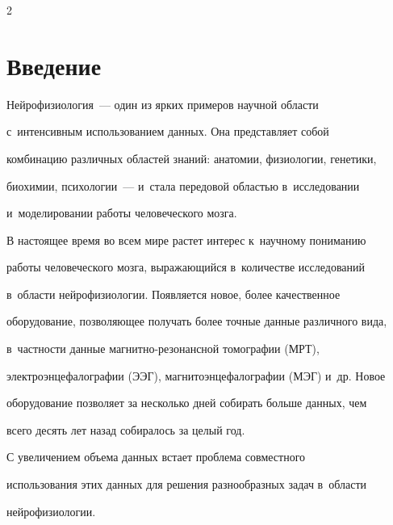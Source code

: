 \begin{multicols}{2}





\label{st\stat}





\section{Введение}










    Нейрофизиология~--- один из ярких примеров научной области 


с~интенсивным использованием данных. Она представляет собой 


комбинацию различных областей знаний: анатомии, физиологии, генетики, 


биохимии, психологии~--- и~стала передовой областью в~исследовании 


и~моделировании работы человеческого мозга.


    


    В настоящее время во всем мире растет интерес к~научному пониманию 


работы человеческого мозга, выражающийся в~количестве исследований 


в~области нейрофизиологии. Появляется новое, более качественное 


оборудование, поз\-во\-ля\-ющее получать более точные данные различного вида, 


в~част\-ности данные маг\-нит\-но-ре\-зо\-нанс\-ной томографии (МРТ), 


электроэнцефалографии (ЭЭГ), магнитоэнцефалографии (МЭГ) и~др. Новое 


оборудование позволяет за несколько дней собирать больше данных, чем 


всего десять лет назад собиралось за целый год.


    


    С увеличением объема данных встает проблема совместного 


использования этих данных для решения разнообразных задач в~области 


нейрофизиологии.



\end{multicols}
